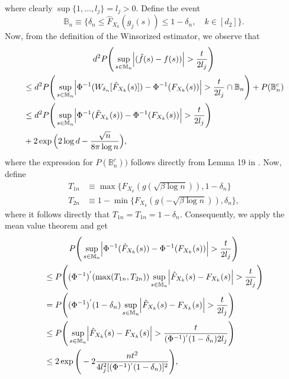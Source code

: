 where clearly $\sup\{1,\dots,l_{j}\} = l_{j} > 0$. Define the event
\begin{equation*}
    \mathbb{B}_n \equiv \{\delta_n \leq \hat{F}_{X_k}(g_j(s)) \leq 1-\delta_n, \quad k \in [d_2]\}.
\end{equation*}
Now, from the definition of the Winsorized estimator, we observe that
\begin{multline*}
    d^2P\Bigg(\sup_{s \in \mathbb{M}_n} \abs{(\hat{f}(s) - f(s))} > \frac{t}{2l_{j}}\Bigg) \\
    \begin{aligned}
         & \leq d^2P\Bigg(\sup_{s \in \mathbb{M}_n} \abs{\Phi^{-1}(W_{\delta_n}[\hat{F}_{X_k}(s)]) - \Phi^{-1}(F_{X_k}(s))} > \frac{t}{2l_{j}} \cap \mathbb{B}_n\Bigg) + P(\mathbb{B}_n^c) \\
         & \leq d^2P\Bigg(\sup_{s \in \mathbb{M}_n} \abs{\Phi^{-1}(\hat{F}_{X_k}(s)) - \Phi^{-1}(F_{X_k}(s))} > \frac{t}{2l_{j}}\Bigg)                                                     \\
         & + 2\exp\Big(2\log d - \frac{\sqrt{n}}{8\pi\log n}\Big),
    \end{aligned}
\end{multline*}
where the expression for $P(\mathbb{B}_n^c))$ follows directly from Lemma 19 in \cite{Liu09}. Now, define
\begin{align*}
    T_{1n} & \equiv \max\Big\{F_{X_k}(g(\sqrt{\beta\log n})), 1-\delta_n\Big\} \\ T_{2n} &\equiv 1 - \min\Big\{F_{X_k}(g(-\sqrt{\beta\log n})), \delta_n\Big\},
\end{align*}
where it follows directly that $T_{1n} = T_{1n} = 1 - \delta_n$. Consequently, we apply the mean value theorem and get
\begin{multline*}
    P\Bigg(\sup_{s \in \mathbb{M}_n} \abs{\Phi^{-1}(\hat{F}_{X_k}(s)) - \Phi^{-1}(F_{X_k}(s))} > \frac{t}{2l_{j}}\Bigg) \\
    \begin{aligned}
         & \leq P\Bigg((\Phi^{-1})^{'}(\max(T_{1n}, T_{2n})) \sup_{s \in \mathbb{M}_n} \abs{\hat{F}_{X_k}(s) - F_{X_k}(s)} > \frac{t}{2l_{j}}\Bigg) \\
         & = P\Bigg((\Phi^{-1})^{'}(1-\delta_n) \sup_{s \in \mathbb{M}_n} \abs{\hat{F}_{X_k}(s) - F_{X_k}(s)} > \frac{t}{2l_{j}}\Bigg)              \\
         & \leq P\Bigg(\sup_{s \in \mathbb{M}_n} \abs{\hat{F}_{X_k}(s) - F_{X_k}(s)} > \frac{t}{(\Phi^{-1})^{'}(1-\delta_n)2l_{j}}\Bigg)            \\
         & \leq 2\exp\Bigg(-2\frac{nt^2}{4l_{j}^2[(\Phi^{-1})^{'}(1-\delta_n)]^2}\Bigg),
    \end{aligned}
\end{multline*}
